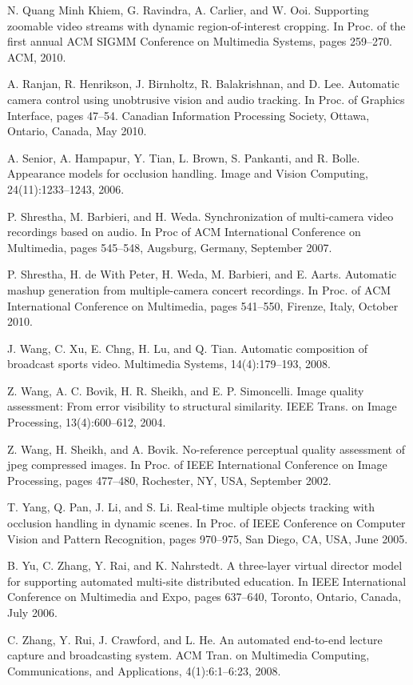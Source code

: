\documentclass{sig-alternate}
\begin{document}
\begin{thebibliography}{21}
N. Quang Minh Khiem, G. Ravindra, A. Carlier, and W. Ooi.
Supporting zoomable video streams with dynamic
region-of-interest cropping. In Proc. of the first annual ACM
SIGMM Conference on Multimedia Systems, pages 259–270.
ACM, 2010.
 
A. Ranjan, R. Henrikson, J. Birnholtz, R. Balakrishnan, and
D. Lee. Automatic camera control using unobtrusive vision
and audio tracking. In Proc. of Graphics Interface, pages
47–54. Canadian Information Processing Society, Ottawa,
Ontario, Canada, May 2010.

A. Senior, A. Hampapur, Y. Tian, L. Brown, S. Pankanti, and
R. Bolle. Appearance models for occlusion handling. Image
and Vision Computing, 24(11):1233–1243, 2006.
 
P. Shrestha, M. Barbieri, and H. Weda. Synchronization of
multi-camera video recordings based on audio. In Proc of
ACM International Conference on Multimedia, pages
545–548, Augsburg, Germany, September 2007.
 
P. Shrestha, H. de With Peter, H. Weda, M. Barbieri, and
E. Aarts. Automatic mashup generation from
multiple-camera concert recordings. In Proc. of ACM
International Conference on Multimedia, pages 541–550,
Firenze, Italy, October 2010.

J. Wang, C. Xu, E. Chng, H. Lu, and Q. Tian. Automatic
composition of broadcast sports video. Multimedia Systems,
14(4):179–193, 2008.
 
Z. Wang, A. C. Bovik, H. R. Sheikh, and E. P. Simoncelli.
Image quality assessment: From error visibility to structural
similarity. IEEE Trans. on Image Processing, 13(4):600–612,
2004.
 
Z. Wang, H. Sheikh, and A. Bovik. No-reference perceptual
quality assessment of jpeg compressed images. In Proc. of
IEEE International Conference on Image Processing, pages
477–480, Rochester, NY, USA, September 2002.

T. Yang, Q. Pan, J. Li, and S. Li. Real-time multiple objects
tracking with occlusion handling in dynamic scenes. In Proc.
of IEEE Conference on Computer Vision and Pattern
Recognition, pages 970–975, San Diego, CA, USA, June
2005.
 
B. Yu, C. Zhang, Y. Rai, and K. Nahrstedt. A three-layer
virtual director model for supporting automated multi-site
distributed education. In IEEE International Conference on
Multimedia and Expo, pages 637–640, Toronto, Ontario,
Canada, July 2006.
 
C. Zhang, Y. Rui, J. Crawford, and L. He. An automated
end-to-end lecture capture and broadcasting system. ACM
Tran. on Multimedia Computing, Communications, and
Applications, 4(1):6:1–6:23, 2008.

\end{thebibliography}
\end{document}
